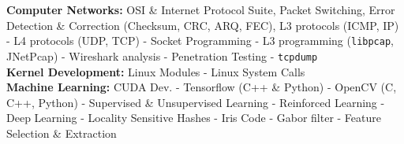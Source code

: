 \documentclass[10pt,a4paper]{article}
\begin{document}
\textbullet \hspace{0.1cm}\textbf{Computer Networks:} OSI \& Internet Protocol Suite, Packet Switching, Error Detection \& Correction (Checksum, CRC, ARQ, FEC), L3 protocols (ICMP, IP) - L4 protocols (UDP, TCP) - Socket Programming - L3 programming (\texttt{libpcap}, JNetPcap) - Wireshark analysis - Penetration Testing - \texttt{tcpdump} \\
\textbullet \hspace{0.1cm}\textbf{Kernel Development:} Linux Modules - Linux System Calls \\
\textbullet \hspace{0.1cm}\textbf{Machine Learning:} CUDA Dev. - Tensorflow (C++ \& Python) - OpenCV (C, C++, Python) - Supervised \& Unsupervised Learning - Reinforced Learning - Deep Learning - Locality Sensitive Hashes - Iris Code - Gabor filter - Feature Selection \& Extraction \\
\end{document}
